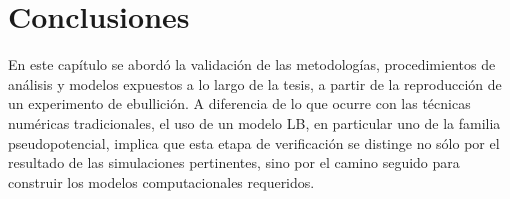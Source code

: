 
\section{Conclusiones}

En este cap\'itulo se abord\'o la validaci\'on de las metodolog\'ias, procedimientos de an\'alisis y modelos expuestos a lo largo de la tesis, a partir de la reproducci\'on de un experimento de ebullici\'on. A diferencia de lo que ocurre con las t\'ecnicas num\'ericas tradicionales, el uso de un modelo LB, en particular uno de la familia pseudopotencial, implica que esta etapa de verificaci\'on se distinge no s\'olo por el resultado de las simulaciones pertinentes, sino por el camino seguido para construir los modelos computacionales requeridos.

